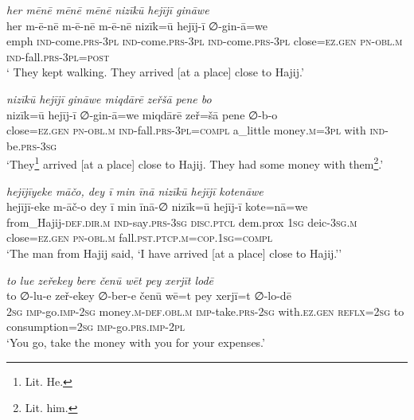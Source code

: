 \ea \label{ŽP.100}
\textit{her mēnē mēnē mēnē nizīkū hejījī gināwe} \\ 
\gll her m-ē-nē m-ē-nē m-ē-nē nizīk=ū hejīj-ī ∅-gin-ā=we \\ 
 emph \textsc{ind-}come\textsc{.prs}\textsc{-3pl} \textsc{ind-}come\textsc{.prs}\textsc{-3pl} \textsc{ind-}come\textsc{.prs}\textsc{-3pl} close\textsc{\textsc{=ez.gen}} \textsc{pn}\textsc{-obl}\textsc{.m} \textsc{ind-}fall\textsc{.prs}\textsc{-3pl}\textsc{=\textsc{post}} \\ 
\glt ` They kept walking. They arrived [at a place] close to Hajij.'
\z 
 
\ea \label{ŽP.101}
\textit{nizīkū hejījī gināwe miqdārē zeřšā pene bo} \\ 
\gll nizīk=ū hejīj-ī ∅-gin-ā=we miqdārē zeř=šā pene ∅-b-o \\ 
 close\textsc{\textsc{=ez.gen}} \textsc{pn}\textsc{-obl}\textsc{.m} \textsc{ind-}fall\textsc{.prs}\textsc{-3pl}\textsc{=compl} a\_little money\textsc{.m}\textsc{=3pl} with \textsc{ind-}be\textsc{.prs}\textsc{-3sg} \\ 
\glt `They\footnote{Lit. He.} arrived [at a place] close to Hajij. They had some money with them\footnote{Lit. him.}.'
\z 
 
\ea \label{ŽP.102}
\textit{hejījīyeke māčo, dey ī min īnā nizīkū hejījī kotenāwe} \\ 
\gll hejījī-eke m-āč-o dey ī min īnā-∅ nizīk=ū hejīj-ī kote=nā=we \\ 
 from\_Hajij\textsc{-def}\textsc{.dir}\textsc{.m} \textsc{ind-}say\textsc{.prs}\textsc{-3sg} \textsc{disc.ptcl} dem.prox \textsc{1sg} deic\textsc{-3sg}\textsc{.m} close\textsc{\textsc{=ez.gen}} \textsc{pn}\textsc{-obl}\textsc{.m} fall\textsc{.pst}\textsc{.ptcp}\textsc{.m}\textsc{=cop}\textsc{.\textsc{1sg}}\textsc{=compl} \\ 
\glt `The man from Hajij said, ‘I have arrived [at a place] close to Hajij.’'
\z 
 
\ea \label{ŽP.103}
\textit{to lue zeřekey bere čenū wēt pey xerjīt lodē} \\ 
\gll to ∅-lu-e zeř-ekey ∅-ber-e čenū wē=t pey xerjī=t ∅-lo-dē \\ 
 \textsc{2sg} \textsc{imp-}go.\textsc{imp-}\textsc{2sg} money\textsc{.m}\textsc{-def}\textsc{.obl}\textsc{.m} \textsc{imp-}take\textsc{.prs}-\textsc{2sg} with\textsc{.ez.gen} \textsc{reflx}\textsc{=\textsc{2sg}} to consumption\textsc{=\textsc{2sg}} \textsc{imp-}go\textsc{.prs}.\textsc{imp-}\textsc{2pl} \\ 
\glt `You go, take the money with you for your expenses.'
\z 
 
